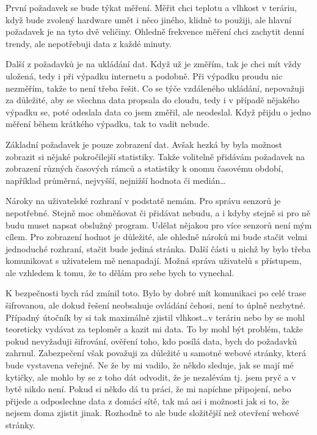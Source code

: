 
První požadavek se bude týkat měření. Měřit chci teplotu a vlhkost v teráriu, když bude zvolený hardware umět i něco 
jiného, klidně to použiji, ale hlavní požadavek je na tyto dvě veličiny. Ohledně frekvence měření chci zachytit denní 
trendy, ale nepotřebuji data z každé minuty.

Další z požadavků je na ukládání dat. Když už je změřím, tak je chci mít vždy uložená, tedy i při výpadku internetu 
a podobně. Při výpadku proudu nic nezměřím, takže to není třeba řešit. Co se týče vzdáleného ukládání, nepovažuji za 
důležité, aby se všechna data propsala do cloudu, tedy i v případě nějakého výpadku se, poté odeslala data co jsem 
změřil, ale neodeslal. Když přijdu o jedno měření během krátkého výpadku, tak to vadit nebude.%

Základní požadavek je pouze zobrazení dat. Avšak hezká by byla možnost zobrazit si nějaké pokročilejší statistiky. Takže 
volitelně přidávám požadavek na zobrazení různých časových rámců a statistiky k onomu časovému období, například 
průměrná, nejvyšší, nejnižší hodnota či medián\ldots %

Nároky na uživatelské rozhraní v podstatě nemám. Pro správu senzorů je nepotřebné. Stejně moc obměňovat či přidávat 
nebudu, a i kdyby stejně si  pro ně budu muset napsat obslužný program. Udělat nějakou  pro 
více senzorů není mým cílem. Pro zobrazení hodnot je důležité, ale ohledně nároků mi bude stačit velmi jednoduché 
rozhraní, stačit bude jediná stránka. Další části u nichž by bylo třeba komunikovat s uživatelem mě nenapadají. Možná 
správa uživatelů s přístupem, ale vzhledem k tomu, že to dělám pro sebe bych to vynechal.

K bezpečnosti bych rád zmínil toto. Bylo by dobré mít komunikaci po celé trase šifrovanou, ale dokud řešení neobsahuje 
ovládání čehosi, není to úplně nezbytné. Případný útočník by si tak maximálně zjistil vlhkost\ldots v teráriu
nebo by se mohl teoreticky vydávat za teploměr a kazit mi data. To by mohl být problém, takže pokud nevyžaduji 
šifrování, ověření toho, kdo posílá data, bych do požadavků zahrnul. Zabezpečení však považuji za důležité u samotné 
webové stránky, která bude vystavena veřejně. Ne že by mi vadilo, že někdo sleduje, jak se mají mé kytičky, ale mohlo by 
se z toho dát odvodit, že je nezalévám tj. jsem pryč a v bytě nikdo není. Pokud si někdo dá tu práci, že mi napíchne 
připojení, nebo přijede a odposlechne data z domácí sítě, tak má asi i možnosti jak si to, že nejsem doma zjistit jinak. 
Rozhodně to ale bude složitější než otevření webové stránky.

